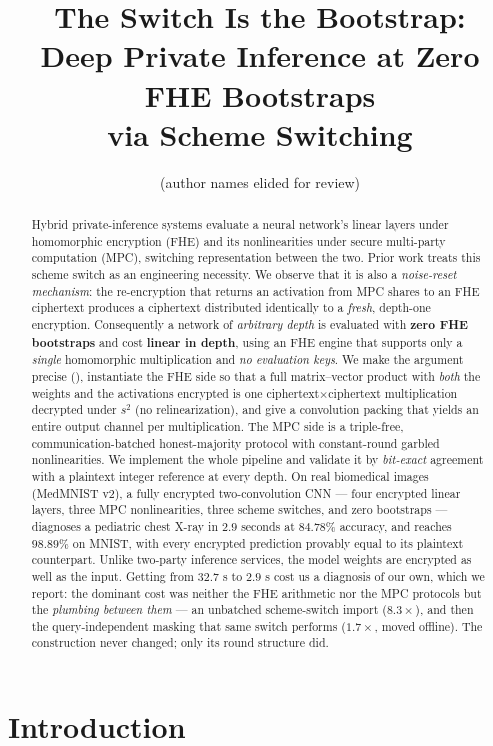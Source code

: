 \documentclass[11pt]{article}
\title{\bfseries The Switch Is the Bootstrap:\\
Deep Private Inference at Zero FHE Bootstraps\\
via Scheme Switching}
\author{%
  (author names elided for review)%
}
\date{}
\theoremstyle{plain}
\theoremstyle{definition}
\theoremstyle{remark}
\begin{document}
\maketitle

\begin{abstract}
Hybrid private-inference systems evaluate a neural network's linear layers
under homomorphic encryption (FHE) and its nonlinearities under secure
multi-party computation (MPC), switching representation between the two.
Prior work treats this scheme switch as an engineering necessity. We observe
that it is also a \emph{noise-reset mechanism}: the re-encryption that
returns an activation from MPC shares to an FHE ciphertext produces a
ciphertext distributed identically to a \emph{fresh}, depth-one encryption.
Consequently a network of \emph{arbitrary depth} is evaluated with
\textbf{zero FHE bootstraps} and cost \textbf{linear in depth}, using an FHE
engine that supports only a \emph{single} homomorphic multiplication and
\emph{no evaluation keys}. We make the argument precise (),
instantiate the FHE side so that a full matrix--vector product with
\emph{both} the weights and the activations encrypted is one
ciphertext$\times$ciphertext multiplication decrypted under $s^2$ (no
relinearization), and give a convolution packing that yields an entire
output channel per multiplication. The MPC side is a triple-free,
communication-batched honest-majority protocol with constant-round garbled
nonlinearities. We implement the whole pipeline and validate it by
\emph{bit-exact} agreement with a plaintext integer reference at every depth.
On real biomedical images (MedMNIST v2), a fully encrypted two-convolution
CNN --- four encrypted linear layers, three MPC nonlinearities, three scheme
switches, and zero bootstraps --- diagnoses a pediatric chest X-ray in
$\mathbf{2.9}$ seconds at $84.78\%$ accuracy, and reaches $98.89\%$ on MNIST,
with every encrypted prediction provably equal to its plaintext counterpart.
Unlike two-party inference services, the model weights are encrypted as well
as the input. Getting from $32.7$ s to $2.9$ s cost us a diagnosis of our
own, which we report: the dominant cost was neither the FHE arithmetic nor
the MPC protocols but the \emph{plumbing between them} --- an unbatched
scheme-switch import ($8.3\times$), and then the query-independent masking
that same switch performs ($1.7\times$, moved offline). The construction
never changed; only its round structure did.
\end{abstract}

\section{Introduction}\label{sec:intro}
\end{document}
